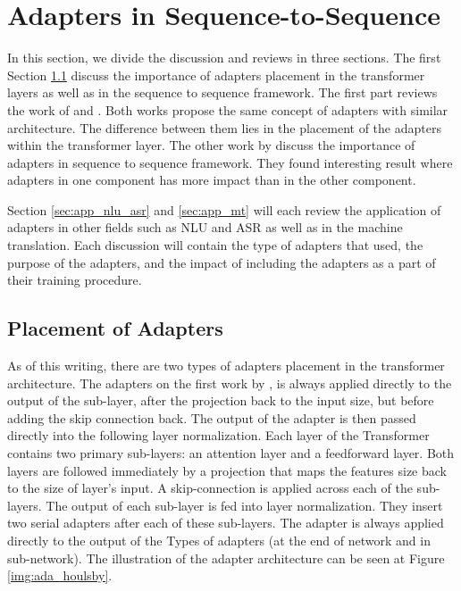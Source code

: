 \section{Adapters in Sequence-to-Sequence}
\label{sec:adapter_seq}

In this section, we divide the discussion and reviews in three sections. The first Section \ref{sec:adapter_place} discuss the importance of adapters placement in the transformer layers as well as in the sequence to sequence framework. The first part reviews the work of \cite{houlsby2019parameter} and \cite{bapna2019simple}. Both works propose the same concept of adapters with similar architecture. The difference between them lies in the placement of the adapters within the transformer layer. The other work by \cite{winata2020adapt} discuss the importance of adapters in sequence to sequence framework. They found interesting result where adapters in one component has more impact than in the other component.

Section \ref{sec:app_nlu_asr} and \ref{sec:app_mt} will each review the application of adapters in other fields such as NLU and ASR as well as in the machine translation. Each discussion will contain the type of adapters that used, the purpose of the adapters, and the impact of including the adapters as a part of their training procedure.

\subsection{Placement of Adapters}
\label{sec:adapter_place}
As of this writing, there are two types of adapters placement in the transformer architecture. The adapters on the first work by \cite{houlsby2019parameter}, is always applied directly to the output of the sub-layer, after the projection back to the input size, but before adding the skip connection back. The output of the adapter is then passed directly into the following layer normalization. Each layer of the Transformer contains two primary sub-layers: an attention layer and a feedforward layer. Both layers are followed immediately by a projection that maps the features size back to the size of layer's input. A skip-connection is applied across each of the sub-layers. The output of each sub-layer is fed into layer normalization. They insert two serial adapters after each of these sub-layers. The adapter is always applied directly to the output of the
Types of adapters (at the end of network and in sub-network). The illustration of the adapter architecture can be seen at Figure \ref{img:ada_houlsby}.

